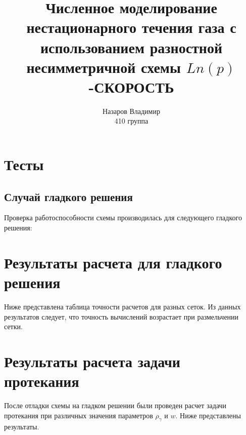 \documentclass[12pt,a4paper]{article}
\begin{document}
\title{Численное моделирование нестационарного течения газа с 
использованием разностной несимметричной схемы $Ln(p)$-СКОРОСТЬ}
\author{Назаров Владимир \\ 410 группа }

\maketitle

\section{\LARGE Тесты}

\subsection{ \Large Случай гладкого решения}
Проверка работоспособности схемы производилась для следующего гладкого решения:

\begin{figure}[h]
\end{figure}




\section{Результаты расчета для гладкого решения}

Ниже представлена таблица точности расчетов для разных сеток. Из данных результатов следует, что точность вычислений 
возрастает при размельчении сетки.



\section{Результаты расчета задачи протекания}
После отладки схемы на гладком решении были проведен расчет задачи протекания при различных значения параметров $\rho_{\gamma}$ и $w$. Ниже представлены результаты.








\end{document}
